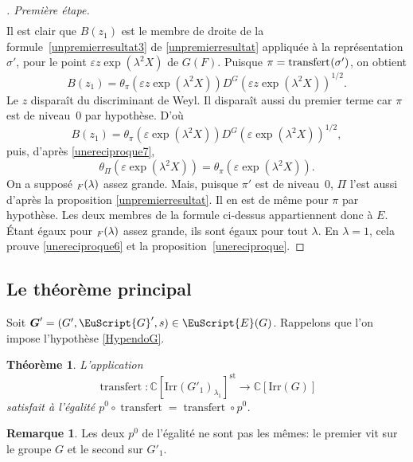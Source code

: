 \documentclass[JEP,XML,SOM,Unicode,francais]{cedram}
\let\mathcal \EuScript
\newcommand{\NoChangel}[1]{%
\expandafter\let\csname old\string#1\endcsname=#1
\let#1=\relax
\newcommand{#1}{\mathcode`l="716C\csname old\string#1\endcsname\mathcode`l="7160 }%
}
\let\epsilon\varepsilon
\newcommand{\rell}{\mathrm{ell}} \NoChangel{\rell}
\newcommand{\Irr}{\mathrm{Irr}}
\newcommand{\st}{\mathrm{st}}
\DeclareMathOperator{\transfert}{transfert}
\DeclareMathOperator{\val}{val} \NoChangel{\val}
\newcommand{\bG}{\boldsymbol{G}}
\newcommand{\cE}{\mathcal{E}}
\newcommand{\cG}{\mathcal{G}}
\newcommand{\CC}{\mathbb{C}}
\theoremstyle{plain}
\newtheorem*{thm*}{Théorème}
\theoremstyle{definition}
\newtheorem*{rem*}{Remarque}
\begin{document}
\begin{proof}[\proofname. Première étape]
\begin{multline*}
\end{multline*}
Il est clair que $B(z_{1})$ est le membre de droite de la formule~\eqref{unpremierresultat3} de \ref{unpremierresultat} appliquée à la représentation $\sigma'$, pour le point $\epsilon z \exp(\lambda^2X)$ de $G(F)$. Puisque $\pi=\transfert_{\rell}(\sigma')$, on obtient
\[
B(z_{1})=\theta_{\pi}(\epsilon z \exp(\lambda^2X))D^G(\epsilon z \exp(\lambda^2X))^{1/2}.
\]
Le $z$ disparaît du discriminant de Weyl. Il disparaît aussi du premier terme car $\pi$ est de niveau~$0$ par hypothèse. D'où
\[
B(z_{1})=\theta_{\pi}(\epsilon \exp(\lambda^2X))D^G(\epsilon \exp(\lambda^2X))^{1/2},
\]
puis, d'après \eqref{unereciproque7},
\[
\theta_{\Pi}( \epsilon \exp(\lambda^2X)) =\theta_{\pi}( \epsilon \exp(\lambda^2X)).
\]
On a supposé $\val_{F}(\lambda)$ assez grande. Mais, puisque $\pi'$ est de niveau~$0$, $\Pi$ l'est aussi d'après la proposition \ref{unpremierresultat}. Il en est de même pour $\pi$ par hypothèse. Les deux membres de la formule ci-dessus appartiennent donc à $E$. Étant égaux pour $\val_{F}(\lambda)$ assez grande, ils sont égaux pour tout $\lambda$. En $\lambda=1$, cela prouve \eqref{unereciproque6} et la proposition~\ref{unereciproque}.
\end{proof}

\subsection{Le théorème principal}\label{letheoreme}

Soit $\bG'=(G',\cG',s)\in \cE(G)$. Rappelons que l'on impose l'hypothèse \ref{HypendoG}.
\begin{thm*}
L'application
\[
\transfert:\CC[\Irr(G'_{1})_{\lambda_{1}}]^{\st}\to \CC[\Irr(G)]
\]
satisfait à l'égalité $p^0\circ \transfert=\transfert\circ p^0$.
\end{thm*}

\begin{rem*}
Les deux $p^0$ de l'égalité ne sont pas les mêmes: le premier vit sur le groupe $G$ et le second sur $G'_{1}$.
\end{rem*}
\end{document}
